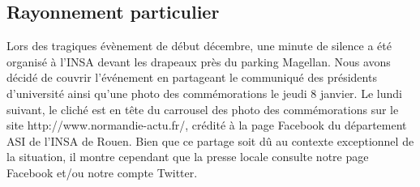 \subsection{Rayonnement particulier}

Lors des tragiques évènement de début décembre, une minute de silence a été organisé à l'INSA devant les drapeaux près du parking Magellan. Nous avons décidé de couvrir l'événement en partageant le communiqué des présidents d'université ainsi qu'une photo des commémorations le jeudi 8 janvier. 
Le lundi suivant, le cliché est en tête du carrousel des photo des commémorations sur le site http://www.normandie-actu.fr/, crédité à la page Facebook du département ASI de l'INSA de Rouen.
Bien que ce partage soit dû au contexte exceptionnel de la situation, il montre cependant que la presse locale consulte notre page Facebook et/ou notre compte Twitter.